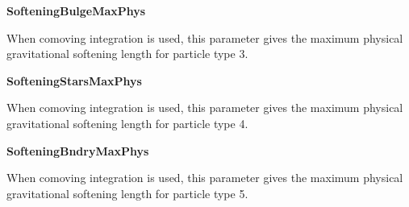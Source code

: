\begin{DoxyItemize}
\item {\bfseries \-Softening\-Bulge\-Max\-Phys} \par
 \-When comoving integration is used, this parameter gives the maximum physical gravitational softening length for particle type 3.
\end{DoxyItemize}


\begin{DoxyItemize}
\item {\bfseries \-Softening\-Stars\-Max\-Phys} \par
 \-When comoving integration is used, this parameter gives the maximum physical gravitational softening length for particle type 4.
\end{DoxyItemize}


\begin{DoxyItemize}
\item {\bfseries \-Softening\-Bndry\-Max\-Phys} \par
 \-When comoving integration is used, this parameter gives the maximum physical gravitational softening length for particle type 5. 
\end{DoxyItemize}